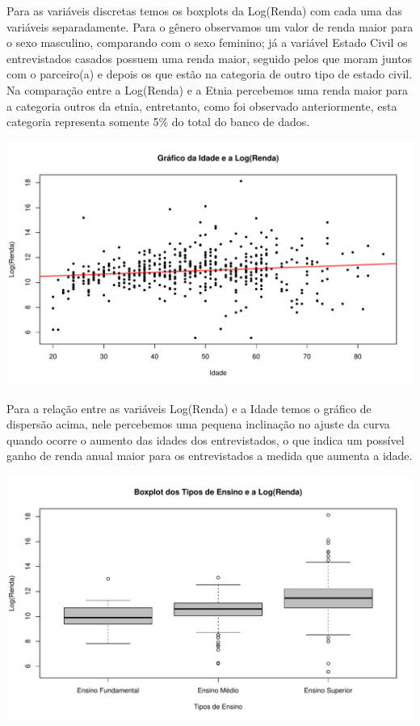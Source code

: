 \documentclass[]{article}
\begin{document}
Para as variáveis discretas temos os boxplots da Log(Renda) com cada uma
das variáveis separadamente. Para o gênero observamos um valor de renda
maior para o sexo masculino, comparando com o sexo feminino; já a
variável Estado Civil os entrevistados casados possuem uma renda maior,
seguido pelos que moram juntos com o parceiro(a) e depois os que estão
na categoria de outro tipo de estado civil. Na comparação entre a
Log(Renda) e a Etnia percebemos uma renda maior para a categoria outros
da etnia, entretanto, como foi observado anteriormente, esta categoria
representa somente 5\% do total do banco de dados.

\begin{flushleft}\includegraphics{Relatorio_IC_files/figure-latex/unnamed-chunk-10-1} \end{flushleft}

Para a relação entre as variáveis Log(Renda) e a Idade temos o gráfico
de dispersão acima, nele percebemos uma pequena inclinação no ajuste da
curva quando ocorre o aumento das idades dos entrevistados, o que indica
um possível ganho de renda anual maior para os entrevistados a medida
que aumenta a idade.

\begin{flushleft}\includegraphics{Relatorio_IC_files/figure-latex/unnamed-chunk-11-1} \end{flushleft}
\end{document}
